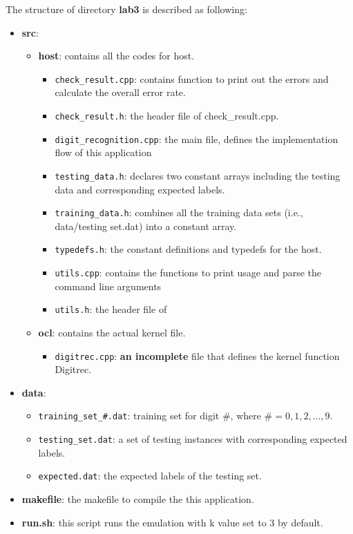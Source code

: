 \documentclass[paper=letter, fontsize=11.6pt]{scrartcl} %
\numberwithin{equation}{section} %
\numberwithin{figure}{section} %
\numberwithin{table}{section} %
\begin{document}
The structure of directory \textbf{lab3} is described as following:

\begin{itemize}
  \item \textbf{src}: 
   	\begin{itemize}
	 	\item \textbf{host}: contains all the codes for host.
		 	\begin{itemize}
	 			\item \texttt{check\_result.cpp}: contains function to print out the errors and calculate the overall error rate.
				\item \texttt{check\_result.h}: the header file of check\_result.cpp.
	 			\item \texttt{digit\_recognition.cpp}: the main file, defines the implementation flow of this application
				\item \texttt{testing\_data.h}: declares two constant arrays including the testing data and corresponding expected labels. 
				\item \texttt{training\_data.h}: combines all the training data sets (i.e., data/testing set.dat) into a constant array. 
				\item \texttt{typedefs.h}: the constant definitions and typedefs for the host. 
				\item \texttt{utils.cpp}: contains the functions to print usage and parse the command line arguments
				\item \texttt{utils.h}: the header file of 
			\end{itemize}
		\item \textbf{ocl}: contains the actual kernel file.
		 	\begin{itemize}
	 			\item \texttt{digitrec.cpp}: \textbf{an incomplete} file that defines the kernel function Digitrec.
			\end{itemize}
	\end{itemize}
  \item \textbf{data}:
  	\begin{itemize}
	 	\item \texttt{training\_set\_\#.dat}: training set for digit $\#$, where $\#=0,1,2,...,9$.
		\item \texttt{testing\_set.dat}: a set of testing instances with corresponding expected labels.
		\item \texttt{expected.dat}: the expected labels of the testing set.
	\end{itemize}
  \item \textbf{makefile}: the makefile to compile the this application.
  \item \textbf{run.sh}: this script runs the emulation with k value set to 3 by default.
\end{itemize}
\end{document}
